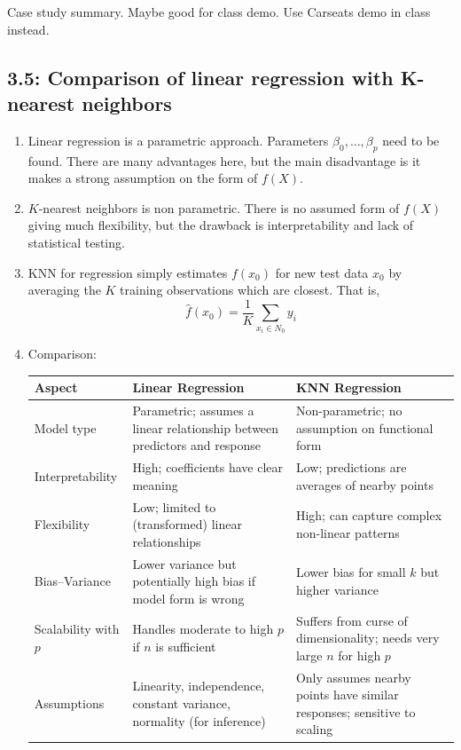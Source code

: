 \documentclass{article}
\begin{document}
Case study summary. Maybe good for class demo. Use Carseats demo in class instead.

\subsection*{3.5: Comparison of linear regression with K-nearest neighbors}

\begin{enumerate}
\item Linear regression is a parametric approach. Parameters $\beta_0, \dots, \beta_p$ need to be found. There are many advantages here, but the main disadvantage is it makes a strong assumption on the form of $f(X)$.
\item $K$-nearest neighbors is non parametric. There is no assumed form of $f(X)$ giving much flexibility, but the drawback is interpretability and lack of statistical testing.
\item KNN for regression simply estimates $f(x_0)$ for new test data $x_0$ by averaging the $K$ training observations which are closest. That is,
\[
\hat{f}(x_0) = \frac{1}{K} \sum_{x_i \in N_0} y_i
\]
\item Comparison:
\begin{table}[h]
\centering
\begin{tabular}{|l|p{6cm}|p{6cm}|}
\hline
\textbf{Aspect} & \textbf{Linear Regression} & \textbf{KNN Regression} \\
\hline
Model type & Parametric; assumes a linear relationship between predictors and response & Non-parametric; no assumption on functional form \\
\hline
Interpretability & High; coefficients have clear meaning & Low; predictions are averages of nearby points \\
\hline
Flexibility & Low; limited to (transformed) linear relationships & High; can capture complex non-linear patterns \\
\hline
Bias--Variance & Lower variance but potentially high bias if model form is wrong & Lower bias for small $k$ but higher variance \\
\hline
Scalability with $p$ & Handles moderate to high $p$ if $n$ is sufficient & Suffers from curse of dimensionality; needs very large $n$ for high $p$ \\
\hline
Assumptions & Linearity, independence, constant variance, normality (for inference) & Only assumes nearby points have similar responses; sensitive to scaling \\

\end{tabular}
\end{table}
\end{enumerate}
\end{document}
